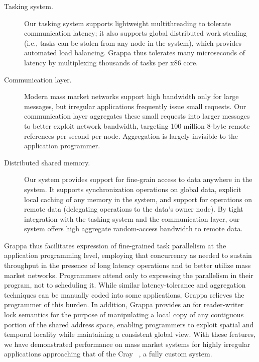 \begin{description}

\item [Tasking system.] Our tasking system supports lightweight
multithreading to tolerate communication latency; it also supports global distributed
work stealing (i.e., tasks can be stolen from any node in the system), which
provides automated load balancing.  Grappa thus tolerates many
microseconds of latency by multiplexing thousands of tasks per x86 core.

\item[Communication layer.] Modern mass market networks
support high bandwidth only for large messages, but irregular applications
frequently issue small requests.   Our communication layer aggregates these small requests into larger messages to better exploit network bandwidth, targeting 100 million 8-byte remote references per second per node.  Aggregation is largely invisible to the application programmer.

\item[Distributed shared memory.] Our  system provides support for
fine-grain access to data anywhere in the system. It supports synchronization
operations on global data, explicit local caching of any memory in the system,
and support for operations on remote data (delegating operations to the data's owner node).
By tight integration with the tasking system and the
communication layer, our  system offers high aggregate random-access bandwidth to remote data.


\end{description}
Grappa thus facilitates
expression of fine-grained task parallelism at the application
programming level, employing that concurrency as needed to sustain throughput in the presence of long latency operations and to better utilize mass market networks.  Programmers attend only to expressing the parallelism in their program, not to scheduling it.  While similar latency-tolerance and aggregation techniques can be manually coded into some
applications, Grappa relieves the programmer of this burden.  In
addition, Grappa provides an  for reader-writer lock semantics for the
purpose of manipulating a local copy of any contiguous portion of the
shared address space, enabling programmers to exploit spatial and
temporal locality while maintaining a consistent global view.  With
these features, we have demonstrated performance on mass market systems
for highly irregular applications approaching that of the Cray ~\cite{feo:xmt}, a
fully custom system.

